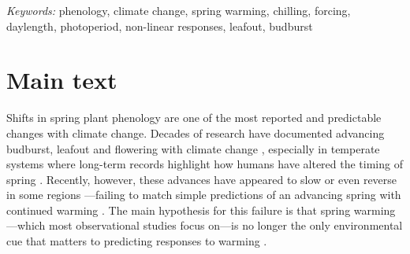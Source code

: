 \documentclass[11pt,letter]{article}
\begin{document}

\noindent \emph{Keywords:} phenology, climate change, spring warming, chilling, forcing, daylength, photoperiod, non-linear responses, leafout, budburst\\

\newpage
\linenumbers
\section{Main text} %
Shifts in spring plant phenology are one of the most reported and predictable changes with climate change. Decades of research have documented advancing budburst, leafout and flowering with climate change \citep{delpierre2009, yu2010,Ellwood2012,jochner2013,hereford2017}, especially in temperate systems where long-term records highlight how humans have altered the timing of spring \citep{Schwartz:1997nn,menzel2006}. Recently, however, these advances have appeared to slow \citep{fu2015} or even reverse in some regions \citep{yu2010}---failing to match simple predictions of an advancing spring with continued warming \citep{Ellwood2012}. The main hypothesis for this failure is that spring warming---which most observational studies focus on---is no longer the only environmental cue that matters to predicting responses to warming \citep{chuine2016,gauzere2019}.\\ 
\end{document}
